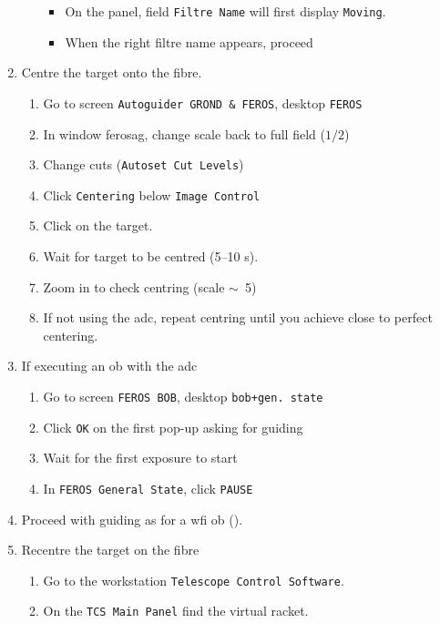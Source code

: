 \documentclass[11pt,fleqn,a4paper]{book}
\begin{document}
\begin{enumerate}
\begin{enumerate}
        \begin{itemize}
             \item On the panel, field \texttt{Filtre Name} will first display \texttt{Moving}.
            \item When the right filtre name appears, proceed 
        \end{itemize}
    \end{enumerate}
    \item Centre the target onto the fibre.
    \begin{enumerate}
        \item Go to screen \texttt{Autoguider GROND \& FEROS}, \gls{desktop} \texttt{FEROS}
        \item In window \gls{ferosag}, change scale back to full field ($1/2$) 
        \item Change cuts (\texttt{Autoset Cut Levels})
        \item Click \texttt{Centering} below \texttt{Image Control}
        \item Click on the target.
        \item Wait for target to be centred (5--10 s).
        \item Zoom in to check centring (scale $\sim$~5)
        \item If not using the \gls{adc}, repeat centring until you achieve close to perfect centering.
    \end{enumerate}
    \item If executing an \gls{ob} with the \gls{adc}
    \begin{enumerate}
        \item Go to screen \texttt{FEROS BOB}, \gls{desktop} \texttt{bob+gen. state}
        \item Click \texttt{OK} on the first pop-up asking for guiding
        \item Wait for the first exposure to start
        \item In \texttt{FEROS \gls{General State}}, click \texttt{PAUSE}
    \end{enumerate}
    \item\label{list:wfiguideforferos} Proceed with guiding as for a \gls{wfi} \gls{ob} ().
    \item Recentre the target on the fibre 
    \begin{enumerate}
         \item Go to the workstation \texttt{Telescope Control Software}.
         \item On the \texttt{TCS Main Panel} find the virtual racket.

\end{enumerate}
\end{enumerate}
\end{document}
